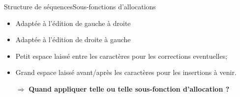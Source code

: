 \begin{frame}{Structure de séquences}{Sous-fonctions d'allocations}
  
  \begin{minipage}{0.45\textwidth}
    \begin{center}
      
    \end{center}
  \end{minipage}
  \hfill
  \begin{minipage}{0.45\textwidth}
    \begin{center}
      
    \end{center}
  \end{minipage}

  \vspace{0.15cm}

  \begin{minipage}{0.45\textwidth}
    \begin{itemize}
    \item Adaptée à l'édition de gauche à droite
    \end{itemize}
  \end{minipage}
  \hfill
  \begin{minipage}{0.45\textwidth}
    \begin{itemize}
    \item Adaptée à l'édition de droite à gauche
    \end{itemize}
  \end{minipage}

  \vspace{0.5cm}
  
  \begin{itemize}
  \item Petit espace laissé entre les caractères pour les corrections eventuelles;
  \item Grand espace laissé avant/après les caractères pour les insertions à venir.
  \end{itemize}
  
  \vspace{0.5cm}
  \large
  \begin{itemize}
  \item [$\Rightarrow$] \textbf{Quand appliquer telle ou telle sous-fonction
      d'allocation ?}
  \end{itemize}

\end{frame}


